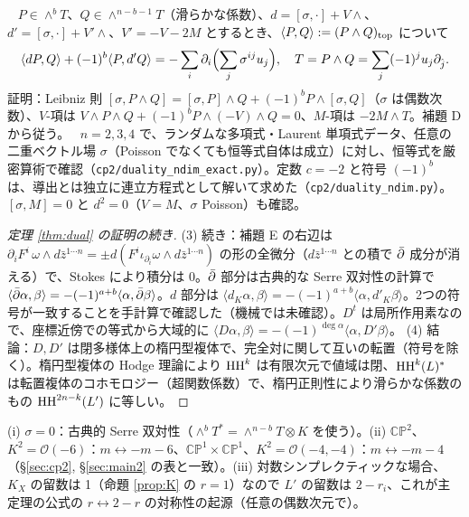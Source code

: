 \begin{lem}[補題 E：転置恒等式]\tP\ \tV\label{lem:E}
$P\in\wedge^bT$、$Q\in\wedge^{n-b-1}T$（滑らかな係数）、$d=[\sigma,\cdot]+V\wedge$、$d'=[\sigma,\cdot]+V'\wedge$、$V'=-V-2M$ とするとき、$\langle P,Q\rangle:=(P\wedge Q)_{\rm top}$ について
\[\langle dP,Q\rangle+(-1)^b\langle P,d'Q\rangle=-\sum_i\partial_i\Bigl(\sum_j\sigma^{ij}u_j\Bigr),\quad T=P\wedge Q=\sum_j(-1)^ju_j\partial_{\hat j}.\]
証明：Leibniz 則 $[\sigma,P\wedge Q]=[\sigma,P]\wedge Q+(-1)^bP\wedge[\sigma,Q]$（$\sigma$ は偶数次数）、$V$-項は $V\wedge P\wedge Q+(-1)^bP\wedge(-V)\wedge Q=0$、$M$-項は $-2M\wedge T$。補題 D から従う。
\tV\ $n=2,3,4$ で、ランダムな多項式・Laurent 単項式データ、任意の二重ベクトル場 $\sigma$（Poisson でなくても恒等式自体は成立）に対し、恒等式を厳密算術で確認（\texttt{cp2/duality\_ndim\_exact.py}）。定数 $c=-2$ と符号 $(-1)^b$ は、導出とは独立に連立方程式として解いて求めた（\texttt{cp2/duality\_ndim.py}）。$[\sigma,M]=0$ と $d^2=0$（$V=M$、$\sigma$ Poisson）も確認。
\end{lem}
\begin{proof}[定理 \ref{thm:dual} の証明の続き]
(3) 続き：補題 E の右辺は $\partial_iF^i\,\omega\wedge d\bar z^{1\cdots n}=\pm d(F^i\iota_{\partial_i}\omega\wedge d\bar z^{1\cdots n})$ の形の全微分（$d\bar z^{1\cdots n}$ との積で $\bar\partial$ 成分が消える）で、Stokes により積分は 0。$\bar\partial$ 部分は古典的な Serre 双対性の計算で $\langle\bar\partial\alpha,\beta\rangle=-(-1)^{a+b}\langle\alpha,\bar\partial\beta\rangle$。$d$ 部分は $\langle d_K\alpha,\beta\rangle=-(-1)^{a+b}\langle\alpha,d'_K\beta\rangle$。2つの符号が一致することを手計算で確認した（機械では未確認\tQ）。$D^t$ は局所作用素なので、座標近傍での等式から大域的に $\langle D\alpha,\beta\rangle=-(-1)^{\deg\alpha}\langle\alpha,D'\beta\rangle$。
(4) 結論：$D,D'$ は閉多様体上の楕円型複体で、完全対に関して互いの転置（符号を除く）。楕円型複体の Hodge 理論により $\mathrm{HH}^k$ は有限次元で値域は閉、$\mathrm{HH}^k(L)^*$ は転置複体のコホモロジー（超関数係数）で、楕円正則性により滑らかな係数のもの $\mathrm{HH}^{2n-k}(L')$ に等しい。\qedhere
\end{proof}
\begin{rem}[整合性の確認\ \tV]
(i) $\sigma=0$：古典的 Serre 双対性（$\wedge^bT^*=\wedge^{n-b}T\otimes K$ を使う）。(ii) $\mathbb{CP}^2$、$K^2=\mathcal O(-6)$：$m\leftrightarrow-m-6$、$\mathbb{CP}^1\times\mathbb{CP}^1$、$K^2=\mathcal O(-4,-4)$：$m\leftrightarrow-m-4$（\S\ref{sec:cp2}, \S\ref{sec:main2} の表と一致）。(iii) 対数シンプレクティックな場合、$K_X$ の留数は 1（命題 \ref{prop:K} の $r=1$）なので $L'$ の留数は $2-r_i$、これが主定理の公式の $r\leftrightarrow2-r$ の対称性の起源（任意の偶数次元で）。
\end{rem}
